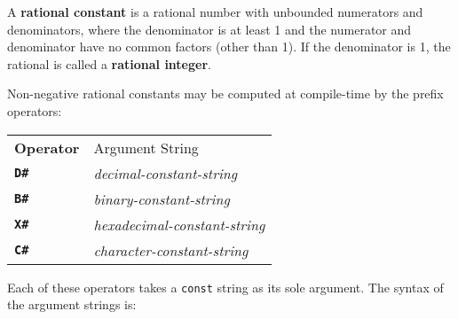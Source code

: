 \documentclass[12pt]{article}
\newcommand{\TT}[1]{{\tt \bfseries #1}}
\newcommand{\key}[1]{{\rm \bfseries #1}}
\begin{document}
A \key{rational constant} is a rational number with unbounded
numerators and denominators, where the
denominator is at least 1 and the numerator and denominator
have no common factors (other than 1).  If the denominator is 1, the
rational is called a \key{rational integer}.

Non-negative rational constants may be computed at compile-time
by the prefix operators:
\begin{center}
\begin{tabular}{ll}
\bf Operator	& Argument String
\\[1ex]
\TT{D\#}	& {\em decimal-constant-string} \\
\TT{B\#}	& {\em binary-constant-string} \\
\TT{X\#}	& {\em hexadecimal-constant-string} \\
\TT{C\#}	& {\em character-constant-string} \\
\end{tabular}
\end{center}

Each of these operators takes a {\tt const} string as its sole argument.
The syntax of the argument strings is:
\end{document}
